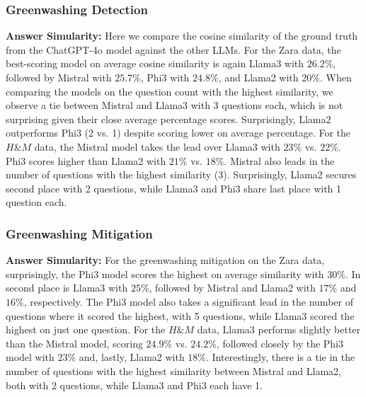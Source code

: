 \documentclass[]{article}
\begin{document}
\subsubsection{Greenwashing Detection}
\textbf{Answer Simularity:} Here we compare the cosine similarity of the ground truth from the ChatGPT-4o model against the other LLMs.
For the Zara data, the best-scoring model on average cosine similarity is again Llama3 with $26.2\%$, followed by Mistral with $25.7\%$, Phi3 with $24.8\%$, and Llama2 with $20\%$.  
When comparing the models on the question count with the highest similarity, we observe a tie between Mistral and Llama3 with 3 questions each, which is not surprising given their close average percentage scores. Surprisingly, Llama2 outperforms Phi3 (2 vs. 1) despite scoring lower on average percentage.\newline  
For the $H\&M$ data, the Mistral model takes the lead over Llama3 with $23\%$ vs. $22\%$. Phi3 scores higher than Llama2 with $21\%$ vs. $18\%$.  
Mistral also leads in the number of questions with the highest similarity (3). Surprisingly, Llama2 secures second place with 2 questions, while Llama3 and Phi3 share last place with 1 question each.

\subsubsection{Greenwashing Mitigation}
\textbf{Answer Simularity:} For the greenwashing mitigation on the Zara data, surprisingly, the Phi3 model scores the highest on average similarity with $30\%$. In second place is Llama3 with $25\%$, followed by Mistral and Llama2 with $17\%$ and $16\%$, respectively. The Phi3 model also takes a significant lead in the number of questions where it scored the highest, with 5 questions, while Llama3 scored the highest on just one question.\newline  
For the $H\&M$ data, Llama3 performs slightly better than the Mistral model, scoring $24.9\%$ vs. $24.2\%$, followed closely by the Phi3 model with $23\%$ and, lastly, Llama2 with $18\%$.  
Interestingly, there is a tie in the number of questions with the highest similarity between Mistral and Llama2, both with 2 questions, while Llama3 and Phi3 each have 1.
\end{document}
